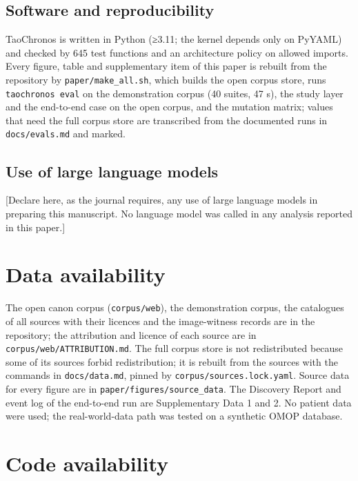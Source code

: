 \documentclass[
]{article}
\begin{document}
\hypertarget{software-and-reproducibility}{%
\subsection{Software and
reproducibility}\label{software-and-reproducibility}}

TaoChronos is written in Python (≥3.11; the kernel depends only on
PyYAML) and checked by 645 test functions and an architecture policy on
allowed imports. Every figure, table and supplementary item of this
paper is rebuilt from the repository by \texttt{paper/make\_all.sh},
which builds the open corpus store, runs \texttt{taochronos\ eval} on
the demonstration corpus (40 suites, 47 s), the study layer and the
end-to-end case on the open corpus, and the mutation matrix; values that
need the full corpus store are transcribed from the documented runs in
\texttt{docs/evals.md} and marked.

\hypertarget{use-of-large-language-models}{%
\subsection{Use of large language
models}\label{use-of-large-language-models}}

{[}Declare here, as the journal requires, any use of large language
models in preparing this manuscript. No language model was called in any
analysis reported in this paper.{]}

\hypertarget{data-availability}{%
\section{Data availability}\label{data-availability}}

The open canon corpus (\texttt{corpus/web}), the demonstration corpus,
the catalogues of all sources with their licences and the image-witness
records are in the repository; the attribution and licence of each
source are in \texttt{corpus/web/ATTRIBUTION.md}. The full corpus store
is not redistributed because some of its sources forbid redistribution;
it is rebuilt from the sources with the commands in
\texttt{docs/data.md}, pinned by \texttt{corpus/sources.lock.yaml}.
Source data for every figure are in \texttt{paper/figures/source\_data}.
The Discovery Report and event log of the end-to-end run are
Supplementary Data 1 and 2. No patient data were used; the
real-world-data path was tested on a synthetic OMOP database.

\hypertarget{code-availability}{%
\section{Code availability}\label{code-availability}}
\end{document}
